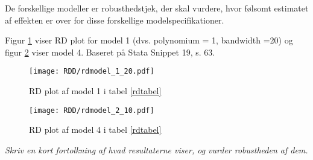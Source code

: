 \documentclass[12pt]{article}
\begin{document}
De forskellige modeller er robusthedstjek, der skal vurdere, hvor følsomt estimatet af effekten er over for disse forskellige modelspecifikationer.

\begin{table}[h] \centering
\end{table}

Figur \ref{rdmodel1} viser RD plot for model 1 (dvs. polynomium = 1, bandwidth =20) og figur \ref{rdmodel4} viser model 4. Baseret på Stata Snippet 19, s. 63.



\begin{figure}
\caption{RD plot  af model 1 i tabel \ref{rdtabel}} \label{rdmodel1}
\texttt{[image: RDD/rdmodel\_1\_20.pdf]}
\end{figure}

\begin{figure}
\caption{RD plot  af model 4 i tabel \ref{rdtabel}} \label{rdmodel4}
\texttt{[image: RDD/rdmodel\_2\_10.pdf]}
\end{figure}


\textit{Skriv en kort fortolkning af hvad resultaterne viser, og vurder robustheden af dem.
}
\clearpage
\printbibliography
\end{document}
